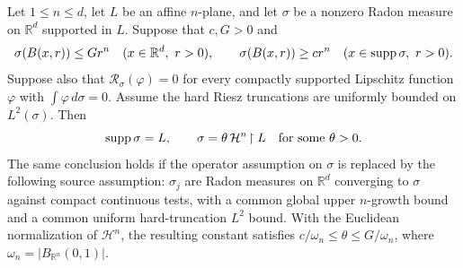 \begin{lemma}
\label{lem:planar-rigidity}
Let $1\le n\le d$, let $L$ be an affine $n$-plane, and let $\sigma$ be a
nonzero Radon measure on $\mathbb R^d$ supported in $L$.  Suppose that
$c,G>0$ and
\[
 \sigma(B(x,r))\le Gr^n\quad(x\in\mathbb R^d,\ r>0),
 \qquad
 \sigma(B(x,r))\ge cr^n\quad(x\in\operatorname{supp}\sigma,\ r>0).
\]
Suppose also that $\mathcal R_\sigma(\varphi)=0$ for every compactly
supported Lipschitz function $\varphi$ with $\int\varphi\,d\sigma=0$.
Assume the hard Riesz truncations are uniformly bounded on $L^2(\sigma)$.
Then
\[
 \operatorname{supp}\sigma=L,
 \qquad \sigma=\theta\,\mathcal H^n\!\restriction L
 \quad\text{for some }\theta>0.
\]
The same conclusion holds if the operator assumption on $\sigma$ is
replaced by the following source assumption: $\sigma_j$ are Radon
measures on $\mathbb R^d$ converging to $\sigma$ against compact continuous
tests, with a common global upper $n$-growth bound and a common uniform
hard-truncation $L^2$ bound.  With the Euclidean normalization of
$\mathcal H^n$, the resulting constant satisfies
$c/\omega_n\le\theta\le G/\omega_n$, where
$\omega_n=|B_{\mathbb R^n}(0,1)|$.
\end{lemma}

